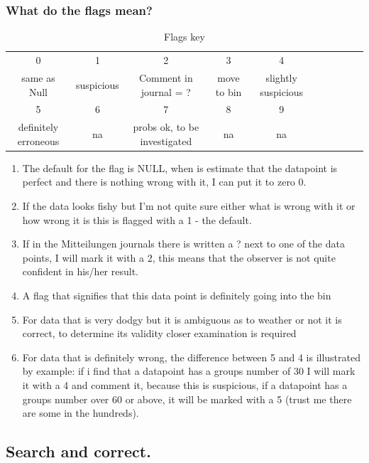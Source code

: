 \documentclass[12pt]{article}
\begin{document}
\subsubsection{What do the flags mean?}\label{flags section}
\newpage%
\begin{table}[h!]
    \centering
    \begin{tabular}{c|c|c|c|c|c|c|c|c|c}
        0 & 1 & 2 & 3 & 4 \\
        same as Null & suspicious & Comment in journal = ? & move to bin & slightly suspicious\\
        \hline
        5 & 6 & 7 & 8 & 9\\
        definitely erroneous & na & probs ok, to be investigated & na & na
         
    \end{tabular}
    \caption{Flags key}
    \label{tab:flag}
\end{table}
\begin{enumerate}[start=0]
    \item The default for the flag is NULL, when is estimate that the datapoint is perfect and there is nothing wrong with it, I can put it to zero 0.
    \item If the data looks fishy but I'm not quite sure either what is wrong with it or how wrong it is this is flagged with a 1 - the default.
    \item If in the Mitteilungen journals there is written a ? next to one of the data points, I will mark it with a 2, this means that the observer is not quite confident in his/her result.
    \item A flag that signifies that this data point is definitely going into the bin
    \item For data that is very dodgy but it is ambiguous as to weather or not it is correct, to determine its validity closer examination is required
    \item For data that is definitely wrong, the difference between 5 and 4 is illustrated by example: if i find that a datapoint has a groups number of 30 I will mark it with a 4 and comment it, because this is suspicious, if a datapoint has a groups number over 60 or above, it will be marked with a 5 (trust me there are some in the hundreds).
\end{enumerate}
  


\subsection{Search and correct.}
\end{document}
